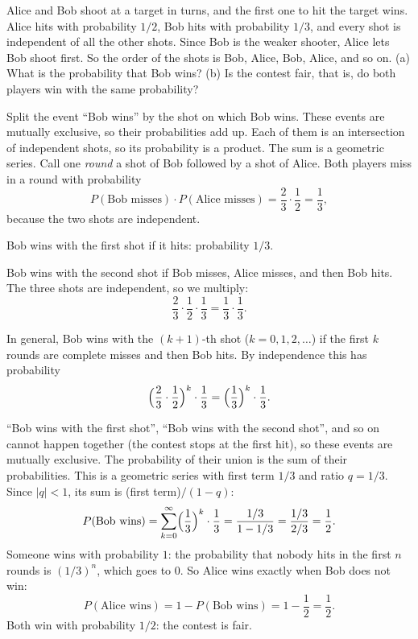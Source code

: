 
\begin{problem}
	Alice and Bob shoot at a target in turns, and the first one to hit the
	target wins. Alice hits with probability $1/2$, Bob hits with probability
	$1/3$, and every shot is independent of all the other shots. Since Bob is
	the weaker shooter, Alice lets Bob shoot first. So the order of the shots
	is Bob, Alice, Bob, Alice, and so on.
	(a) What is the probability that Bob wins?
	(b) Is the contest fair, that is, do both players win with the same
	probability?
\end{problem}

\begin{solution}
	\idea Split the event ``Bob wins'' by the shot on which Bob wins. These
	events are mutually exclusive, so their probabilities add up. Each of them
	is an intersection of independent shots, so its probability is a product.
	The sum is a geometric series.
	 Call one \emph{round} a shot of Bob followed by a shot of
	Alice. Both players miss in a round with probability
	\[ P(\text{Bob misses})\cdot P(\text{Alice misses})
		=\frac23\cdot\frac12=\frac13, \]
	because the two shots are independent.

	Bob wins with the first shot if it hits: probability $1/3$.

	Bob wins with the second shot if Bob misses, Alice misses, and then Bob
	hits. The three shots are independent, so we multiply:
	\[ \frac23\cdot\frac12\cdot\frac13=\frac13\cdot\frac13. \]

	In general, Bob wins with the $(k+1)$-th shot ($k=0,1,2,\dots$) if the
	first $k$ rounds are complete misses and then Bob hits. By independence
	this has probability
	\[ \Bigl(\frac23\cdot\frac12\Bigr)^{k}\cdot\frac13
		=\Bigl(\frac13\Bigr)^{k}\cdot\frac13. \]

	``Bob wins with the first shot'', ``Bob wins with the second shot'', and so
	on cannot happen together (the contest stops at the first hit), so these
	events are mutually exclusive. The probability of their union is the sum
	of their probabilities. This is a geometric series with first term $1/3$
	and ratio $q=1/3$. Since $|q|<1$, its sum is (first term)$/(1-q)$:
	\[ P(\text{Bob wins})
		=\sum_{k=0}^{\infty}\Bigl(\frac13\Bigr)^{k}\cdot\frac13
		=\frac{1/3}{1-1/3}=\frac{1/3}{2/3}=\frac12. \]
	 Someone wins with probability $1$: the probability that
	nobody hits in the first $n$ rounds is $(1/3)^n$, which goes to $0$.
	So Alice wins exactly when Bob does not win:
	\[ P(\text{Alice wins})=1-P(\text{Bob wins})=1-\frac12=\frac12. \]
	Both win with probability $1/2$: the contest is fair.


\end{solution}
